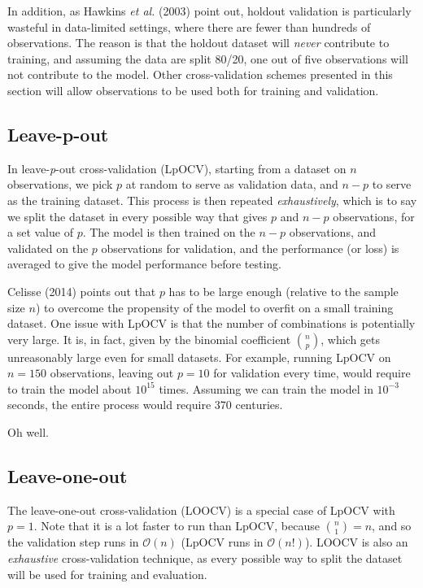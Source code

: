 \documentclass[
  letterpaper,
]{scrbook}
\begin{document}
In addition, as Hawkins \emph{et al.} (2003) point out, holdout
validation is particularly wasteful in data-limited settings, where
there are fewer than hundreds of observations. The reason is that the
holdout dataset will \emph{never} contribute to training, and assuming
the data are split 80/20, one out of five observations will not
contribute to the model. Other cross-validation schemes presented in
this section will allow observations to be used both for training and
validation.

\subsection{Leave-p-out}\label{leave-p-out}

In leave-\emph{p}-out cross-validation (LpOCV), starting from a dataset
on \(n\) observations, we pick \(p\) at random to serve as validation
data, and \(n-p\) to serve as the training dataset. This process is then
repeated \emph{exhaustively}, which is to say we split the dataset in
every possible way that gives \(p\) and \(n-p\) observations, for a set
value of \(p\). The model is then trained on the \(n-p\) observations,
and validated on the \(p\) observations for validation, and the
performance (or loss) is averaged to give the model performance before
testing.

Celisse (2014) points out that \(p\) has to be large enough (relative to
the sample size \(n\)) to overcome the propensity of the model to
overfit on a small training dataset. One issue with LpOCV is that the
number of combinations is potentially very large. It is, in fact, given
by the binomial coefficient \(\binom{n}{p}\), which gets unreasonably
large even for small datasets. For example, running LpOCV on \(n=150\)
observations, leaving out \(p=10\) for validation every time, would
require to train the model about \(10^{15}\) times. Assuming we can
train the model in \(10^{-3}\) seconds, the entire process would require
370 centuries.

Oh well.

\subsection{Leave-one-out}\label{leave-one-out}

The leave-one-out cross-validation (LOOCV) is a special case of LpOCV
with \(p=1\). Note that it is a lot faster to run than LpOCV, because
\(\binom{n}{1}=n\), and so the validation step runs in
\(\mathcal{O}(n)\) (LpOCV runs in \(\mathcal{O}(n!)\)). LOOCV is also an
\emph{exhaustive} cross-validation technique, as every possible way to
split the dataset will be used for training and evaluation.
\end{document}
